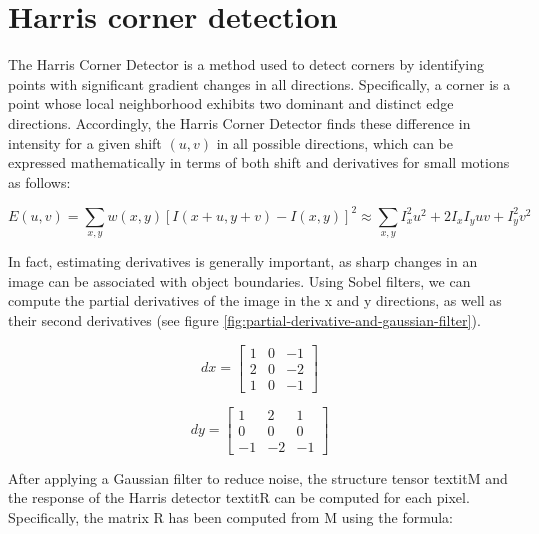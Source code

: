 \chapter{Harris corner detection}
The Harris Corner Detector is a method used to detect corners by identifying points with significant gradient 
changes in all directions. Specifically, a corner is a point whose local neighborhood exhibits two dominant and 
distinct edge directions. Accordingly, the Harris Corner Detector finds these difference in intensity for a given 
shift $(u, v)$ in all possible directions, which can be expressed mathematically in terms of both shift and 
derivatives for small motions as follows:

\begin{equation}
	E(u, v) = \sum_{x, y} w(x, y) [I(x+u, y+v)-I(x, y)]^2 \approx \sum_{x, y} I_x^2 u^2 + 2I_x I_y uv + I_y^2 v^2
\end{equation}

In fact, estimating derivatives is generally important, as sharp changes in an image can be associated with object 
boundaries. Using Sobel filters, we can compute the partial derivatives of the image in the x and y directions, as 
well as their second derivatives (see figure \ref{fig:partial-derivative-and-gaussian-filter}).

\begin{minipage}{0.45\textwidth}
	\centering
	\begin{equation}
		dx = \begin{bmatrix}
			1 & 0 & -1 \\
			2 & 0 & -2 \\
			1 & 0 & -1
		\end{bmatrix}
		\label{eq:dx}
	\end{equation}
\end{minipage}
\hfill 
\begin{minipage}{0.45\textwidth}
	\centering
	\begin{equation}
		dy = \begin{bmatrix}
			1 & 2 & 1 \\
			0 & 0 & 0 \\
			-1 & -2 & -1
		\end{bmatrix}
		\label{eq:dy}
	\end{equation}
\end{minipage}

After applying a Gaussian filter to reduce noise, the structure tensor textit{M} and the response of the Harris 
detector textit{R} can be computed for each pixel. Specifically, the matrix R has been computed from M using the 
formula:


